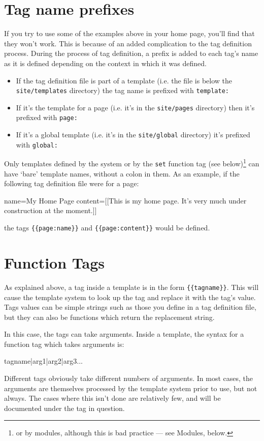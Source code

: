 \section{Tag name prefixes}
If you try to use some of the examples above in your home page, you'll find that they won't work.
This is because of an added complication to the tag definition process.
During the process of tag definition, a prefix is added to each tag's name as it is defined depending
on the context in which it was defined. 
\begin{itemize}
\item If the tag definition file is part of a template (i.e. the file is below the \texttt{site/templates}
directory) the tag name is prefixed with \texttt{template:}
\item If it's the template for a page (i.e. it's in the \texttt{site/pages} directory) then it's prefixed
with \texttt{page:}
\item If it's a global template (i.e. it's in the \texttt{site/global} directory) it's prefixed with
\texttt{global:}
\end{itemize}
Only templates defined by the system or by the \texttt{set} function tag (see below)\footnote{or by modules,
although this is bad practice --- see
Modules, below.} can have `bare' template names, without a colon in them. As an example, if the following
tag definition file were for a page:
\begin{MyVerbatim}
 name=My Home Page
 content=[[This is my home page. It's very much under construction
 at the moment.]] 
\end{MyVerbatim}
the tags \texttt{\{\{page:name\}\}} and \texttt {\{\{page:content\}\}} would be defined.

\clearpage 
\section{Function Tags}
\label{functiontags}
As explained above, a tag inside a template is in the form \verb,{{tagname}},.
This will cause the template system to look up the tag and replace it
with the tag's value. Tags values can be simple strings such as those
you define in a tag definition file, but they can also be functions which
return the replacement string.

In this case, the tags can take arguments. Inside a template, the syntax for a function tag
which takes arguments is:
\begin{MyVerbatim}
{{tagname|arg1|arg2|arg3...}}
\end{MyVerbatim}
Different tags obviously take different numbers of arguments. In most cases, the arguments are
themselves processed by the template system prior to use, but not always. 
The cases where this isn't done are relatively few, and will be documented
under the tag in question.


